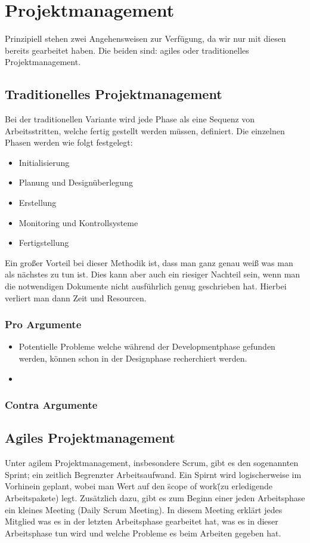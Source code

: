 \chapter{Projektmanagement}

Prinzipiell stehen zwei Angehensweisen zur Verfügung, da wir nur mit diesen bereits gearbeitet haben. Die beiden sind: agiles oder traditionelles Projektmanagement.

\section{Traditionelles Projektmanagement}
Bei der traditionellen Variante wird jede Phase als eine Sequenz von Arbeitsstritten, welche fertig gestellt werden müssen, definiert. Die einzelnen Phasen werden wie folgt festgelegt:
\begin{itemize}
		\item Initialisierung
		\item Planung und Designüberlegung
		\item Erstellung
		\item Monitoring und Kontrollsysteme
		\item Fertigstellung
\end{itemize}

Ein großer Vorteil bei dieser Methodik ist, dass man ganz genau weiß was man als nächstes zu tun ist. Dies kann aber auch ein riesiger Nachteil sein, wenn man die notwendigen Dokumente nicht ausführlich genug geschrieben hat. Hierbei verliert man dann Zeit und Resourcen.

\subsection{Pro Argumente}
\begin{itemize}
		\item Potentielle Probleme welche während der Developmentphase gefunden werden, können schon in der Designphase recherchiert werden.
		\item 
\end{itemize}

\subsection{Contra Argumente}


\section{Agiles Projektmanagement}
Unter agilem Projektmanagement, insbesondere Scrum, gibt es den sogenannten Sprint; ein zeitlich Begrenzter Arbeitsaufwand. Ein Spirnt wird logischerweise im Vorhinein geplant, wobei man Wert auf den \"scope of work\" (zu erledigende Arbeitspakete) legt. Zusätzlich dazu, gibt es zum Beginn einer jeden Arbeitsphase ein kleines Meeting (Daily Scrum Meeting). In diesem Meeting erklärt jedes Mitglied was es in der letzten Arbeitsphase gearbeitet hat, was es in dieser Arbeitsphase tun wird und welche Probleme es beim Arbeiten gegeben hat.

